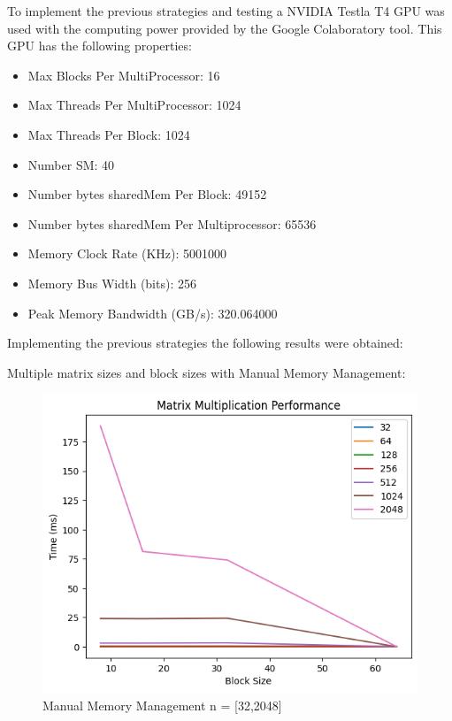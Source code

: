 \documentclass[12p,english]{article}
\begin{document}
To implement the previous strategies and testing a NVIDIA Testla T4 GPU was used with the computing power provided by the Google Colaboratory tool. This GPU has the following properties:
\begin{itemize}
    \item Max Blocks Per MultiProcessor: 16 
    \item Max Threads Per MultiProcessor: 1024
    \item Max Threads Per Block: 1024
    \item Number SM: 40
    \item Number bytes sharedMem Per Block: 49152
    \item Number bytes sharedMem Per Multiprocessor: 65536
    \item Memory Clock Rate (KHz): 5001000
    \item Memory Bus Width (bits): 256
    \item Peak Memory Bandwidth (GB/s): 320.064000 
\end{itemize}  
Implementing the previous strategies the following results were obtained:

\medskip
\medskip

Multiple matrix sizes and block sizes with Manual Memory Management:
\begin{figure}[H]
\centering
\includegraphics[scale= 0.6]{ManualS.png}
\caption{Manual Memory Management n = [32,2048]}
\end{figure}
\end{document}
